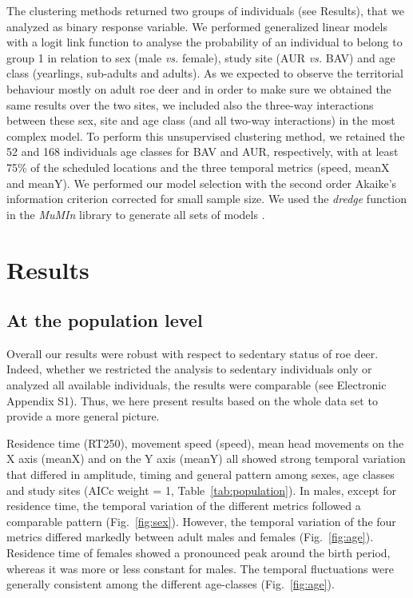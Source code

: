 \documentclass[a4paper,11pt]{article}
\begin{document}
The clustering methods returned two groups of individuals (see
Results), that we analyzed as binary response variable. We performed
generalized linear models with a logit link function to analyse the
probability of an individual to belong to group 1 in relation to sex
(male \textit{vs.} female), study site (AUR \textit{vs.} BAV) and age
class (yearlings, sub-adults and adults). As we expected to observe
the territorial behaviour mostly on adult roe deer and in order to
make sure we obtained the same results over the two sites, we included
also the three-way interactions between these sex, site and age class
(and all two-way interactions) in the most complex model. To perform
this unsupervised clustering method, we retained the 52 and 168
individuals age classes for BAV and AUR, respectively, with at least
75\% of the scheduled locations and the three temporal metrics (speed,
meanX and meanY). We performed our model selection with the second
order Akaike’s information criterion corrected for small sample
size. We used the \textit{dredge} function in the \textit{MuMIn}
library to generate all sets of models \citep{barton_mumin:_2016}.

\section*{Results}
\subsection*{At the population level}

Overall our results were robust with respect to sedentary status of
roe deer. Indeed, whether we restricted the analysis to sedentary
individuals only or analyzed all available individuals, the results
were comparable (see Electronic Appendix S1). Thus, we here present
results based on the whole data set to provide a more general picture.

Residence time (RT250), movement speed (speed), mean head movements on
the X axis (meanX) and on the Y axis (meanY) all showed strong
temporal variation that differed in amplitude, timing and general
pattern among sexes, age classes and study sites (AICc weight = 1,
Table~\ref{tab:population}). In males, except for residence time, the
temporal variation of the different metrics followed a comparable
pattern (Fig.~\ref{fig:sex}). However, the temporal variation of the
four metrics differed markedly between adult males and females
(Fig.~\ref{fig:age}). Residence time of females showed a pronounced
peak around the birth period, whereas it was more or less constant for
males. The temporal fluctuations were generally consistent among the
different age-classes (Fig.~\ref{fig:age}).
\end{document}
